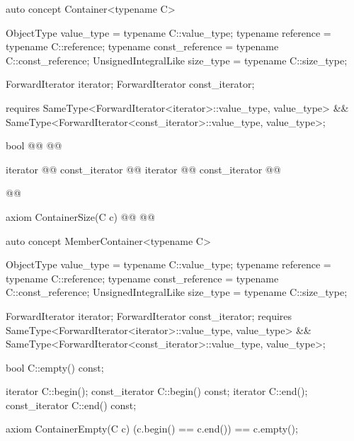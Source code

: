 \documentclass[american,twoside]{book}
\begin{document}
\begin{itemdecl}
auto concept Container<typename C> {
  ObjectType           value_type      = typename C::value_type;
  typename             reference       = typename C::reference;
  typename             const_reference = typename C::const_reference;
  UnsignedIntegralLike size_type       = typename C::size_type;

  ForwardIterator iterator;
  ForwardIterator const_iterator;

  requires SameType<ForwardIterator<iterator>::value_type, value_type> 
           && SameType<ForwardIterator<const_iterator>::value_type, value_type>;

  bool      @@
  @@

  iterator       @@
  const_iterator @@
  iterator       @@
  const_iterator @@

  @@

  axiom ContainerSize(C c) {
    @@
    @@
  }
}

\end{itemdecl}

\begin{itemdescr}
\pnum
{}

\pnum
{}
  \removedCCC{\mbox{\tcode{[C.begin(), C.end())}} is a valid range.}
  \addedConcepts{\mbox{\tcode{[begin(c), end(c))}} is a valid range.} 

\end{itemdescr}
 

\begin{itemdecl}
auto concept MemberContainer<typename C> {
  ObjectType           value_type      = typename C::value_type;
  typename             reference       = typename C::reference;
  typename             const_reference = typename C::const_reference;
  UnsignedIntegralLike size_type       = typename C::size_type;

  ForwardIterator iterator;
  ForwardIterator const_iterator;
  requires SameType<ForwardIterator<iterator>::value_type, value_type> 
           && SameType<ForwardIterator<const_iterator>::value_type, value_type>;

  bool      C::empty() const;

  iterator       C::begin();
  const_iterator C::begin() const;
  iterator       C::end();
  const_iterator C::end() const;

  axiom ContainerEmpty(C c) {
    (c.begin() == c.end()) == c.empty();
  }
}
\end{itemdecl}
\end{document}
